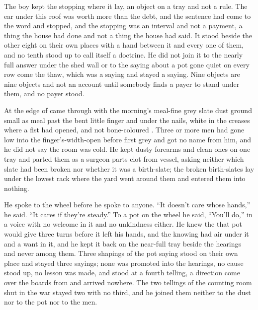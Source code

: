 The boy kept the stopping where it lay, an object on a tray and not a rule. The ear under this roof was worth more than the debt, and the sentence had come to the word and stopped, and the stopping was an interval and not a payment, a thing the house had done and not a thing the house had said. It stood beside the other eight on their own places with a hand between it and every one of them, and no tenth stood up to call itself a doctrine. He did not join it to the nearly full answer under the shed wall or to the saying about a pot gone quiet on every row come the thaw, which was a saying and stayed a saying. Nine objects are nine objects and not an account until somebody finds a payer to stand under them, and no payer stood.

At the edge of   came through with the morning's meal-fine grey slate dust ground small as meal past the bent little finger and under the nails, white in the creases where a fist had opened, and not bone-coloured . Three or more men had gone low into the finger's-width-open  before first grey and got no name from him, and he did not say the room was cold. He kept dusty forearms and clean ones on one tray and parted them as a surgeon parts clot from vessel, asking neither which slate had been broken nor whether it was a birth-slate; the broken birth-slates lay under the lowest rack where the yard went around them and entered them into nothing.

He spoke to the wheel before he spoke to anyone. “It doesn't care whose hands,” he said. “It cares if they're steady.” To a pot on the wheel he said, “You'll do,” in a voice with no welcome in it and no unkindness either. He knew the  that pot would give three turns before it left his hands, and the knowing had air under it and a want in it, and he kept it back on the near-full tray beside the hearings and never among them. Three shapings of the pot saying stood on their own place and stayed three sayings; none was promoted into the hearings, no cause stood up, no lesson was made, and  stood at a fourth telling, a direction come over the boards from  and arrived nowhere. The two tellings of the counting room shut in the war stayed two with no third, and he joined them neither to the dust nor to the pot nor to the men.

